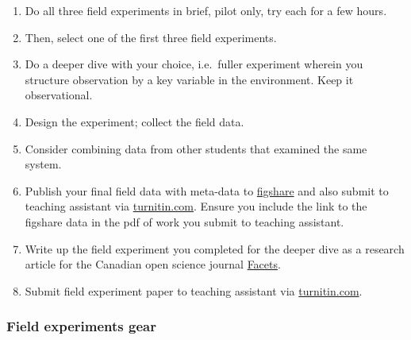 \documentclass[
]{book}
\providecommand{\tightlist}{%
  \setlength{\itemsep}{0pt}\setlength{\parskip}{0pt}}
\begin{document}
\begin{enumerate}
\def\labelenumi{\arabic{enumi}.}
\tightlist
\item
  Do all three field experiments in brief, pilot only, try each for a few hours.\\
\item
  Then, select one of the first three field experiments.\\
\item
  Do a deeper dive with your choice, i.e.~fuller experiment wherein you structure observation by a key variable in the environment. Keep it observational.\\
\item
  Design the experiment; collect the field data.\\
\item
  Consider combining data from other students that examined the same system.
\item
  Publish your final field data with meta-data to \href{https://figshare.com}{figshare} and also submit to teaching assistant via \href{https://www.turnitin.com}{turnitin.com}. Ensure you include the link to the figshare data in the pdf of work you submit to teaching assistant.\\
\item
  Write up the field experiment you completed for the deeper dive as a research article for the Canadian open science journal \href{https://www.facetsjournal.com/}{Facets}.\\
\item
  Submit field experiment paper to teaching assistant via \href{https://www.turnitin.com}{turnitin.com}.
\end{enumerate}

\hypertarget{field-experiments-gear}{%
\subsubsection*{Field experiments gear}\label{field-experiments-gear}}
\end{document}
